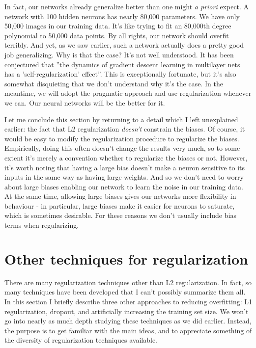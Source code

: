 In fact, our networks already generalize better than one might \textit{a priori} expect. A network with 100 hidden neurons has nearly 80,000 parameters. We have only 50,000 images in our training data. It's like trying to fit an 80,000th degree polynomial to 50,000 data points. By all rights, our network should overfit terribly. And yet, as we saw earlier, such a network actually does a pretty good job generalizing. Why is that the case? It's not well understood. It has been conjectured \cite{Lecun98gradient-basedlearning} that ''the dynamics of gradient descent learning in multilayer nets has a 'self-regularization' effect''. This is exceptionally fortunate, but it's also somewhat disquieting that we don't understand why it's the case. In the meantime, we will adopt the pragmatic approach and use regularization whenever we can. Our neural networks will be the better for it.

Let me conclude this section by returning to a detail which I left unexplained earlier: the fact that L2 regularization \textit{doesn't} constrain the biases. Of course, it would be easy to modify the regularization procedure to regularize the biases. Empirically, doing this often doesn't change the results very much, so to some extent it's merely a convention whether to regularize the biases or not. However, it's worth noting that having a large bias doesn't make a neuron sensitive to its inputs in the same way as having large weights. And so we don't need to worry about large biases enabling our network to learn the noise in our training data. At the same time, allowing large biases gives our networks more flexibility in behaviour - in particular, large biases make it easier for neurons to saturate, which is sometimes desirable. For these reasons we don't usually include bias terms when regularizing.


\section{Other techniques for regularization}

There are many regularization techniques other than L2 regularization. In fact, so many techniques have been developed that I can't possibly summarize them all. In this section I briefly describe three other approaches to reducing overfitting: L1 regularization, dropout, and artificially increasing the training set size. We won't go into nearly as much depth studying these techniques as we did earlier. Instead, the purpose is to get familiar with the main ideas, and to appreciate something of the diversity of regularization techniques available.


